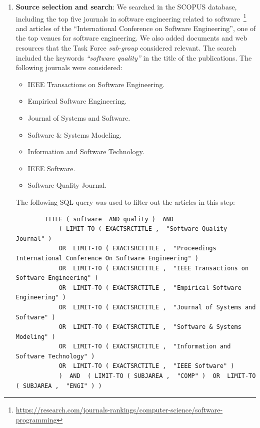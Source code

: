 \documentclass[a4paper]{article}
\begin{document}
\begin{enumerate}
    \item \textbf{Source selection and search}: We searched in the SCOPUS database, including the top five journals in software engineering related to software~\footnote{\url{https://research.com/journals-rankings/computer-science/software-programming}} and articles of the  ``International Conference on Software Engineering'', one of the top venues for software engineering. We also added documents and web resources that the Task Force \textit{sub-group} considered relevant. The search included the keywords \textit{``software quality''} in the title of the publications. The following journals were considered:

    \begin{itemize}
        \item IEEE Transactions on Software Engineering.
        \item Empirical Software Engineering.
        \item Journal of Systems and Software.
        \item Software \& Systems Modeling.
        \item Information and Software Technology.
        \item IEEE Software.
        \item Software Quality Journal.
    \end{itemize}

    The following SQL query was used to filter out the articles in this step:
    \begin{tiny}
    \begin{verbatim}
        TITLE ( software  AND quality )  AND  
            ( LIMIT-TO ( EXACTSRCTITLE ,  "Software Quality Journal" )  
            OR  LIMIT-TO ( EXACTSRCTITLE ,  "Proceedings International Conference On Software Engineering" ) 
            OR  LIMIT-TO ( EXACTSRCTITLE ,  "IEEE Transactions on Software Engineering" )
            OR  LIMIT-TO ( EXACTSRCTITLE ,  "Empirical Software Engineering" ) 
            OR  LIMIT-TO ( EXACTSRCTITLE ,  "Journal of Systems and Software" ) 
            OR  LIMIT-TO ( EXACTSRCTITLE ,  "Software & Systems Modeling" ) 
            OR  LIMIT-TO ( EXACTSRCTITLE ,  "Information and Software Technology" )  
            OR  LIMIT-TO ( EXACTSRCTITLE ,  "IEEE Software" )   
            )  AND  ( LIMIT-TO ( SUBJAREA ,  "COMP" )  OR  LIMIT-TO ( SUBJAREA ,  "ENGI" ) )  
    \end{verbatim}
    \end{tiny}


\end{enumerate}
\end{document}
